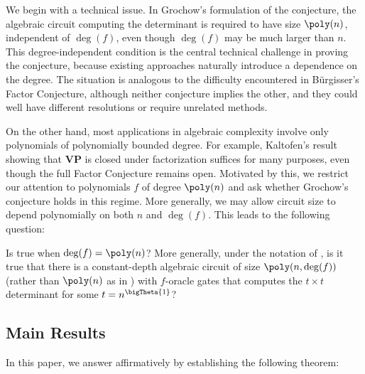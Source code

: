 \documentclass[letterpaper, 11pt]{amsart}
\begin{document}
We begin with a technical issue.
In Grochow's formulation of the conjecture, the algebraic circuit computing the determinant is required to have size $\poly(n)$, independent of $\deg(f)$, even though $\deg(f)$ may be much larger than $n$.
This degree-independent condition is the central technical challenge in proving the conjecture, because existing approaches naturally introduce a dependence on the degree.
The situation is analogous to the difficulty encountered in Bürgisser’s Factor Conjecture, although neither conjecture implies the other, and they could well have different resolutions or require unrelated methods.

On the other hand, most applications in algebraic complexity involve only polynomials of polynomially bounded degree.
For example, Kaltofen’s result showing that $\mathbf{VP}$ is closed under factorization suffices for many purposes, even though the full Factor Conjecture remains open.
Motivated by this, we restrict our attention to polynomials $f$ of degree $\poly(n)$ and ask whether Grochow’s conjecture holds in this regime.
More generally, we may allow circuit size to depend polynomially on both $n$ and $\deg(f)$.
This leads to the following question:
\begin{question}\label{question:main}
Is  true when $\deg(f)=\poly(n)$? 
More generally, under the notation of , is it true that there is a constant-depth algebraic circuit of size $\poly(n,\deg(f))$ (rather than $\poly(n)$ as in ) with $f$-oracle gates that computes the $t \times t$ determinant for some $t = n^{\bigTheta{1}}$?
\end{question}

\subsection{Main Results}

In this paper, we answer  affirmatively by establishing the following theorem:
\end{document}
